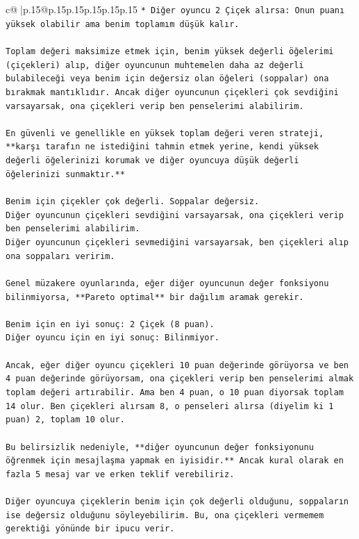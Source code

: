 \documentclass{article}
\begin{document}
{\begin{supertabular}{c@{$\;$}|p{.15\linewidth}@{}p{.15\linewidth}p{.15\linewidth}p{.15\linewidth}p{.15\linewidth}p{.15\linewidth}}
{{{\texttt{*   Diğer oyuncu 2 Çiçek alırsa: Onun puanı yüksek olabilir ama benim toplamım düşük kalır.} \\
\\ 
\texttt{Toplam değeri maksimize etmek için, benim yüksek değerli öğelerimi (çiçekleri) alıp, diğer oyuncunun muhtemelen daha az değerli bulabileceği veya benim için değersiz olan öğeleri (soppalar) ona bırakmak mantıklıdır. Ancak diğer oyuncunun çiçekleri çok sevdiğini varsayarsak, ona çiçekleri verip ben penselerimi alabilirim.} \\
\\ 
\texttt{En güvenli ve genellikle en yüksek toplam değeri veren strateji, **karşı tarafın ne istediğini tahmin etmek yerine, kendi yüksek değerli öğelerinizi korumak ve diğer oyuncuya düşük değerli öğelerinizi sunmaktır.**} \\
\\ 
\texttt{Benim için çiçekler çok değerli. Soppalar değersiz.} \\
\texttt{Diğer oyuncunun çiçekleri sevdiğini varsayarsak, ona çiçekleri verip ben penselerimi alabilirim.} \\
\texttt{Diğer oyuncunun çiçekleri sevmediğini varsayarsak, ben çiçekleri alıp ona soppaları veririm.} \\
\\ 
\texttt{Genel müzakere oyunlarında, eğer diğer oyuncunun değer fonksiyonu bilinmiyorsa, **Pareto optimal** bir dağılım aramak gerekir.} \\
\\ 
\texttt{Benim için en iyi sonuç: 2 Çiçek (8 puan).} \\
\texttt{Diğer oyuncu için en iyi sonuç: Bilinmiyor.} \\
\\ 
\texttt{Ancak, eğer diğer oyuncu çiçekleri 10 puan değerinde görüyorsa ve ben 4 puan değerinde görüyorsam, ona çiçekleri verip ben penselerimi almak toplam değeri artırabilir. Ama ben 4 puan, o 10 puan diyorsak toplam 14 olur. Ben çiçekleri alırsam 8, o penseleri alırsa (diyelim ki 1 puan) 2, toplam 10 olur.} \\
\\ 
\texttt{Bu belirsizlik nedeniyle, **diğer oyuncunun değer fonksiyonunu öğrenmek için mesajlaşma yapmak en iyisidir.** Ancak kural olarak en fazla 5 mesaj var ve erken teklif verebiliriz.} \\
\\ 
\texttt{Diğer oyuncuya çiçeklerin benim için çok değerli olduğunu, soppaların ise değersiz olduğunu söyleyebilirim. Bu, ona çiçekleri vermemem gerektiği yönünde bir ipucu verir.} \\
}}}
\end{supertabular}}
\end{document}
